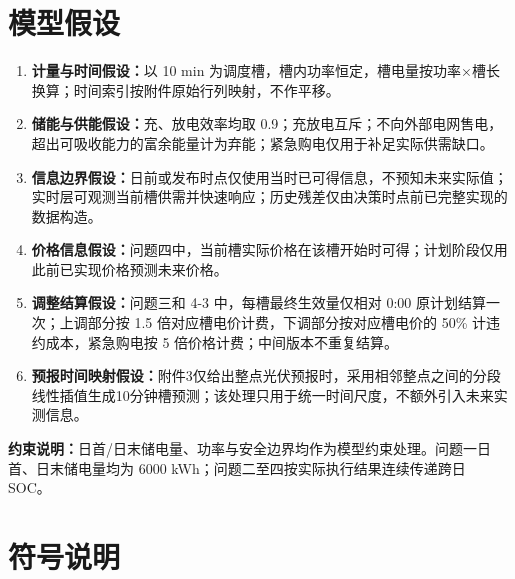 \documentclass[zihao=-4,a4paper,UTF8,fontset=none]{ctexart}
\providecommand{\tightlist}{\setlength{\itemsep}{0pt}\setlength{\parskip}{0pt}}
\begin{document}
\section{模型假设}\label{ux6a21ux578bux5047ux8bbe}

\begin{enumerate}
\def\labelenumi{\arabic{enumi}.}
\tightlist
\item
  \textbf{计量与时间假设：}以 10 min 为调度槽，槽内功率恒定，槽电量按功率×槽长换算；时间索引按附件原始行列映射，不作平移。
\item
  \textbf{储能与供能假设：}充、放电效率均取 0.9；充放电互斥；不向外部电网售电，超出可吸收能力的富余能量计为弃能；紧急购电仅用于补足实际供需缺口。
\item
  \textbf{信息边界假设：}日前或发布时点仅使用当时已可得信息，不预知未来实际值；实时层可观测当前槽供需并快速响应；历史残差仅由决策时点前已完整实现的数据构造。
\item
  \textbf{价格信息假设：}问题四中，当前槽实际价格在该槽开始时可得；计划阶段仅用此前已实现价格预测未来价格。
\item
  \textbf{调整结算假设：}问题三和 4-3 中，每槽最终生效量仅相对 0:00 原计划结算一次；上调部分按 1.5 倍对应槽电价计费，下调部分按对应槽电价的 50\% 计违约成本，紧急购电按 5 倍价格计费；中间版本不重复结算。
\item
  \textbf{预报时间映射假设：}附件3仅给出整点光伏预报时，采用相邻整点之间的分段线性插值生成10分钟槽预测；该处理只用于统一时间尺度，不额外引入未来实测信息。
\end{enumerate}

\textbf{约束说明：}日首/日末储电量、功率与安全边界均作为模型约束处理。问题一日首、日末储电量均为 6000 kWh；问题二至四按实际执行结果连续传递跨日 SOC。

\clearpage\section{符号说明}
\end{document}
